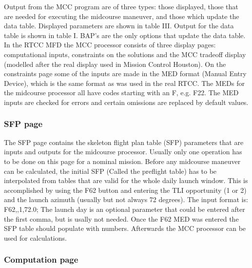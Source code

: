 \documentclass[11pt]{article} %
\begin{document}
Output from the MCC program are of three types: those displayed, those that are needed for executing the midcourse maneuver, and those which update the data table. Displayed parameters are shown in table III. Output for the data table is shown in table I. BAP’s are the only options that update the data table.\\

In the RTCC MFD the MCC processor consists of three display pages: computational inputs, constraints on the solutions and the MCC tradeoff display (modelled after the real display used in Mission Control Houston). On the constraints page some of the inputs are made in the MED format (Manual Entry Device), which is the same format as was used in the real RTCC. The MEDs for the midcourse processor all have codes starting with an F, e.g. F22. The MED inputs are checked for errors and certain omissions are replaced by default values.\\

\subsubsection{SFP page}

The SFP page contains the skeleton flight plan table (SFP) parameters that are inputs and outputs for the midcourse processor. Usually only one operation has to be done on this page for a nominal mission. Before any midcourse maneuver can be calculated, the initial SFP (Called the preflight table) has to be interpolated from tables that are valid for the whole daily launch window. This is accomplished by using the F62 button and entering the TLI opportunity (1 or 2) and the launch azimuth (usually but not always 72 degrees). The input format is: F62,,1,72.0; The launch day is an optional parameter that could be entered after the first comma, but is usally not needed. Once the F62 MED was entered the SFP table should populate with numbers. Afterwards the MCC processor can be used for calculations.

\subsubsection{Computation page}
\end{document}
